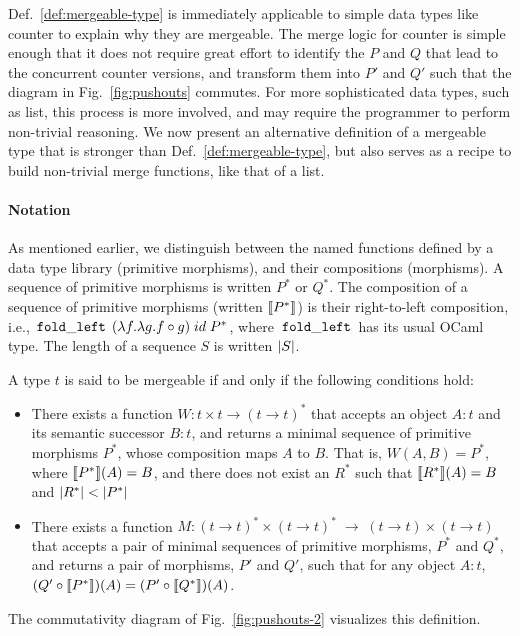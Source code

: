 
Def.~\ref{def:mergeable-type} is immediately applicable to simple data
types like counter to explain why they are mergeable. The merge logic
for counter is simple enough that it does not require great effort to
identify the $P$ and $Q$ that lead to the concurrent counter versions,
and transform them into $P'$ and $Q'$ such that the diagram in
Fig.~\ref{fig:pushouts} commutes. For more
sophisticated data types, such as list, this process is more involved,
and may require the programmer to perform non-trivial reasoning. We
now present an alternative definition of a mergeable type that is
stronger than Def.~\ref{def:mergeable-type}, but also serves as a
recipe to build non-trivial merge functions, like that of a list.

\paragraph{Notation} As mentioned earlier, we distinguish between the
named functions defined by a data type library (primitive morphisms),
and their compositions (morphisms). A sequence of primitive morphisms
is written $P^*$ or $Q^*$. The composition of a sequence of primitive
morphisms (written $\llbracket P^* \rrbracket$) is their right-to-left composition,
i.e., $\,{\tt fold\_left}\,\;(\lambda f.\lambda g. f \circ g)\; id\; P^*$,
where $\,{\tt fold\_left}\,$ has its usual OCaml type. The length of a
sequence $S$ is written $\left|S\right|$.

\begin{definition} 
\label{def:mergeable-type-2}
A type $t$ is said to be mergeable if and only if the following
conditions hold:
\begin{itemize}
  \item There exists a function $W: t \times t \rightarrow (t
  \rightarrow t)^*$ that accepts an object $A:t$ and its
  semantic successor $B:t$, and returns a minimal sequence of
  primitive morphisms $P^*$, whose composition maps $A$ to $B$. That
  is, $W(A,B) = P^*$, where $\llbracket P^* \rrbracket(A) = B$, and there does not
  exist an $R^*$ such that $\llbracket R^* \rrbracket(A) = B$ and $\left|R^*\right| <
  \left|P^*\right|$

  \item There exists a function $M: (t \rightarrow t)^*\!\times\!(t
  \rightarrow t)^* \;\rightarrow\; (t \rightarrow t)\!\times\!(t
  \rightarrow t)$ that accepts a pair of minimal sequences of
  primitive morphisms, $P^*$ and $Q^*$, and returns a pair of morphisms,
  $P'$ and $Q'$, such that for any object $A:t$, $(Q' \circ
  \llbracket P^* \rrbracket)(A) = (P' \circ \llbracket Q^* \rrbracket)(A)$.  
\end{itemize}
The commutativity diagram of Fig.~\ref{fig:pushouts-2} visualizes this
definition. 
\end{definition}

